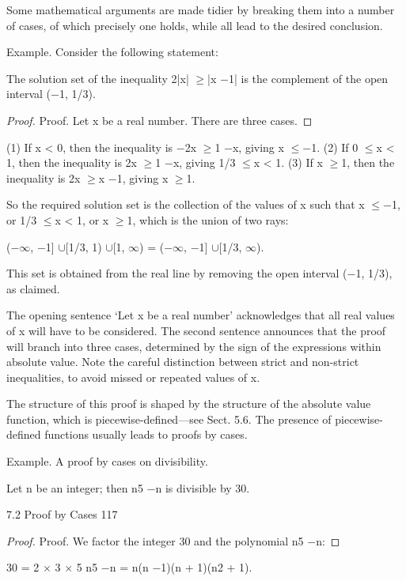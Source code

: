 \documentclass[11pt]{article}
\theoremstyle{plain}
\theoremstyle{definition}
\begin{document}
Some mathematical arguments are made tidier by breaking them into a number of cases, of which precisely one holds, while all lead to the desired conclusion.

Example. Consider the following statement:

The solution set of the inequality 2|x| $\geq$|x $-$1| is the complement of the open interval ($-$1, 1/3).

\begin{proof}
Proof. Let x be a real number. There are three cases.
\end{proof}

(1) If x < 0, then the inequality is $-$2x $\geq$1 $-$x, giving x $\leq$$-$1. (2) If 0 $\leq$x < 1, then the inequality is 2x $\geq$1 $-$x, giving 1/3 $\leq$x < 1. (3) If x $\geq$1, then the inequality is 2x $\geq$x $-$1, giving x $\geq$1.

So the required solution set is the collection of the values of x such that x $\leq$$-$1, or 1/3 $\leq$x < 1, or x $\geq$1, which is the union of two rays:

($-$$\infty$, $-$1] $\cup$[1/3, 1) $\cup$[1, $\infty$) = ($-$$\infty$, $-$1] $\cup$[1/3, $\infty$).

This set is obtained from the real line by removing the open interval ($-$1, 1/3), as claimed. 

The opening sentence `Let x be a real number' acknowledges that all real values of x will have to be considered. The second sentence announces that the proof will branch into three cases, determined by the sign of the expressions within absolute value. Note the careful distinction between strict and non-strict inequalities, to avoid missed or repeated values of x.

The structure of this proof is shaped by the structure of the absolute value function, which is piecewise-defined---see Sect. 5.6. The presence of piecewise-defined functions usually leads to proofs by cases.

Example. A proof by cases on divisibility.

Let n be an integer; then n5 $-$n is divisible by 30.

7.2 Proof by Cases 117

\begin{proof}
Proof. We factor the integer 30 and the polynomial n5 $-$n:
\end{proof}

30 = 2 $\times$ 3 $\times$ 5 n5 $-$n = n(n $-$1)(n + 1)(n2 + 1).
\end{document}
